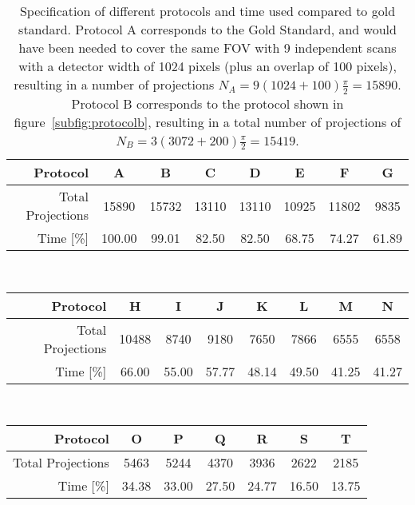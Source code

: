 \cbstart
\begin{table}%
	\centering%
	\caption{Specification of different protocols and time used compared to gold standard. Protocol A corresponds to the Gold Standard, and would have been needed to cover the same FOV with 9 independent scans with a detector width of 1024 pixels (plus an overlap of 100 pixels), resulting in a number of projections $N_{A}=9(1024+100)\frac{\pi}{2}=15890$. Protocol B corresponds to the protocol shown in figure~\ref{subfig:protocolb}, resulting in a total number of projections of $N_{B}=3(3072+200)\frac{\pi}{2}=15419$.}%
	\begin{tabular*}{\textwidth}{r@{\extracolsep\fill}ccccccc}%
		\toprule%
		Protocol & A & B & C & D & E & F & G \\%
		\midrule%
		Total Projections & 15890 & 15732 & 13110 & 13110 & 10925 & 11802 & 9835 \\
		Time [\%] & 100.00 & 99.01 & 82.50 & 82.50 & 68.75 & 74.27 & 61.89 \\
		\bottomrule%
	\end{tabular*}\\%
	\ifhtml
		\end{table}%
		\begin{table}%
		\centering%
	\else
	\fi
	\begin{tabular*}{\textwidth}{r@{\extracolsep\fill}ccccccc}%
		\toprule%
		Protocol & H & I & J & K & L & M & N \\%
		\midrule%
		Total Projections & 10488 & 8740 & 9180 & 7650 & 7866 & 6555 & 6558 \\
		Time [\%] & 66.00 & 55.00 & 57.77 & 48.14 & 49.50 & 41.25 & 41.27 \\
		\bottomrule%
	\end{tabular*}\\%
	\ifhtml
		\end{table}%
		\begin{table}%
		\centering%
	\else
	\fi
	\begin{tabular*}{\textwidth}{r@{\extracolsep\fill}cccccc}%
		\toprule%
		Protocol & O & P & Q & R & S & T \\%
		\midrule%
		Total Projections & 5463 & 5244 & 4370 & 3936 & 2622 & 2185 \\
		Time [\%] & 34.38 & 33.00 & 27.50 & 24.77 & 16.50 & 13.75 \\
		\bottomrule%
	\end{tabular*}%
	\label{tab:projections}%
\end{table}%
\cbend

